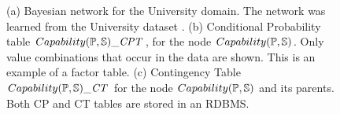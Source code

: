 \begin{figure}[htbp] %
 \centering
{} 
\caption{(a) Bayesian network for the University domain. 
The network was learned from the University dataset \cite{bib:bbsite}.
(b) Conditional Probability table $Capability(\P,\S)\_\cptable$, for the node $Capability(\P,\S)$. Only value combinations that occur in the data are shown. This is an example of a factor table. (c) Contingency Table $Capability(\P,\S)\_\cttable$ for the node $Capability(\P,\S)$ and its parents. Both CP and CT tables are stored in an RDBMS.}
 \label{fig:pbn}
\label{fig:ct-cp-table}
\end{figure}

